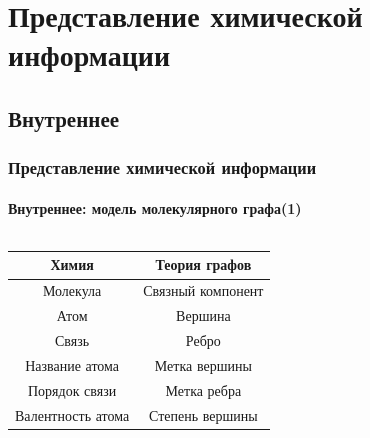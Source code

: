 \section{Представление химической информации}
\subsection{Внутреннее}
\begin{frame}
  \frametitle{Представление химической информации}
  \framesubtitle{Внутреннее: модель молекулярного графа(1)}
   \begin{columns}
    \begin{column}{0.6\textwidth}
      \begin{tabular}{|c|c|}
      \hline Химия & Теория графов \\ \hline
      {\color{magenta}Молекула} & {\color{orange}Связный компонент} \\ \hline
      {\color{magenta}Атом} & {\color{orange}Вершина} \\ \hline
      {\color{magenta}Связь} & {\color{orange}Ребро} \\ \hline
      {\color{magenta}Название атома} & {\color{orange}Метка вершины} \\ \hline
      {\color{magenta}Порядок связи} & {\color{orange}Метка ребра} \\ \hline
      {\color{magenta}Валентность атома} & {\color{orange}Степень вершины} \\ \hline
      \end{tabular} \\
    \end{column}
    \begin{column}{0.2\textwidth}    

\end{column}
\end{columns}
\end{frame}
